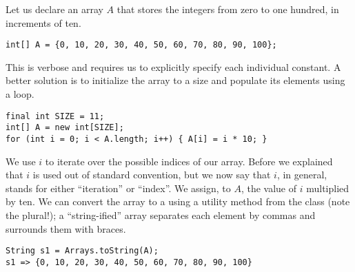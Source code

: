 \example Let us declare an array $A$ that stores the integers from zero to one hundred, in increments of ten.
\begin{verbatim}
int[] A = {0, 10, 20, 30, 40, 50, 60, 70, 80, 90, 100};
\end{verbatim}
This is verbose and requires us to explicitly specify each individual constant. A better solution is to initialize the array to a size and populate its elements using a loop.
\begin{verbatim}
final int SIZE = 11;
int[] A = new int[SIZE];
for (int i = 0; i < A.length; i++) { A[i] = i * 10; }
\end{verbatim}
We use $i$ to iterate over the possible indices of our array. Before we explained that $i$ is used out of standard convention, but we now say that $i$, in general, stands for either ``iteration'' or ``index''. We assign, to $A$, the value of $i$ multiplied by ten. We can convert the array to a  using a utility method from the  class (note the plural!); a ``string-ified'' array separates each element by commas and surrounds them with braces.
\begin{verbatim}
String s1 = Arrays.toString(A);
s1 => {0, 10, 20, 30, 40, 50, 60, 70, 80, 90, 100}
\end{verbatim}

